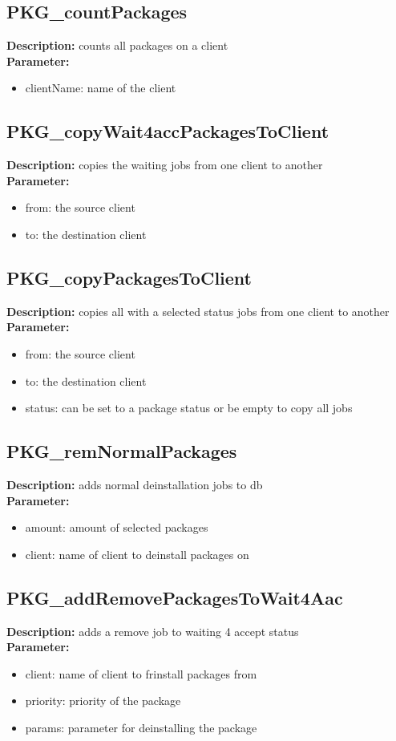 \subsection{PKG\_countPackages}
\textbf{Description:} counts all packages on a client\\
\textbf{Parameter:}
\begin{itemize}
\item clientName: name of the client 
\end{itemize}

\subsection{PKG\_copyWait4accPackagesToClient}
\textbf{Description:} copies the waiting jobs from one client to another\\
\textbf{Parameter:}
\begin{itemize}
\item from: the source client
\item to: the destination client
\end{itemize}

\subsection{PKG\_copyPackagesToClient}
\textbf{Description:} copies all with a selected status jobs from one client to another\\
\textbf{Parameter:}
\begin{itemize}
\item from: the source client
\item to: the destination client
\item status: can be set to a package status or be empty to copy all jobs
\end{itemize}

\subsection{PKG\_remNormalPackages}
\textbf{Description:} adds normal deinstallation jobs to db\\
\textbf{Parameter:}
\begin{itemize}
\item amount: amount of selected packages
\item client: name of client to deinstall packages on
\end{itemize}

\subsection{PKG\_addRemovePackagesToWait4Aac}
\textbf{Description:} adds a remove job to waiting 4 accept status\\
\textbf{Parameter:}
\begin{itemize}
\item client: name of client to frinstall packages from
\item priority: priority of the package
\item params: parameter for deinstalling the package
\end{itemize}

